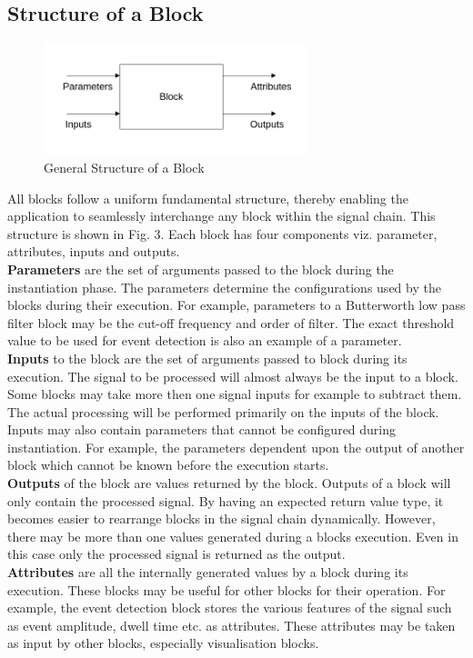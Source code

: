 \documentclass[journal]{IEEEtran}
\begin{document}
\subsection{Structure of a Block}


\begin{figure}[!t]
\centering
\includegraphics[width=3in]{Block.png}
\caption{General Structure of a Block}
\label{fig_3}
\end{figure}

All blocks follow a uniform fundamental structure, thereby enabling the application to seamlessly interchange any block within the signal chain. This structure is shown in Fig. 3. Each block has four components viz. parameter, attributes, inputs and outputs. \\
{\bf{Parameters}} are the set of arguments passed to the block during the instantiation phase. The parameters determine the configurations used by the blocks during their execution. For example, parameters to a Butterworth low pass filter block may be the cut-off frequency and order of filter. The exact threshold value to be used for event detection is also an example of a parameter. \\
{\bf{Inputs}} to the block are the set of arguments passed to block during its execution. The signal to be processed will almost always be the input to a block. Some blocks may take more then one signal inputs for example to subtract them. The actual processing will be performed primarily on the inputs of the block. Inputs may also contain parameters that cannot be configured during instantiation. For example, the parameters dependent upon the output of another block which cannot be known before the execution starts. \\
{\bf{Outputs}} of the block are values returned by the block. Outputs of a block will only contain the processed signal. By having an expected return value type, it becomes easier to rearrange blocks in the signal chain dynamically. However, there may be more than one values generated during a blocks execution. Even in this case only the processed signal is returned as the output. \\
{\bf{Attributes}} are all the internally generated values by a block during its execution. These blocks may be useful for other blocks for their operation. For example, the event detection block stores the various features of the signal such as event amplitude, dwell time etc. as attributes. These attributes may be taken as input by other blocks, especially visualisation blocks.
\end{document}
